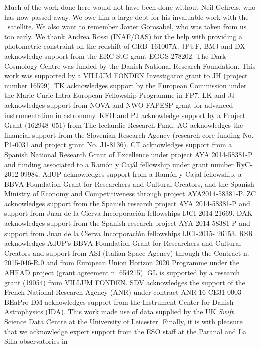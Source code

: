 \documentclass[longauth]{aa}    %
\begin{document}
\begin{acknowledgements}
Much of the work done here would not have been done without Neil Gehrels, who
has now passed away. We owe him a large debt for his invaluable work with the
\swift~satellite. We also want to remember Javier Gorosabel, who was taken from
us too early. 
%
We thank Andrea Rossi (INAF/OAS) for the help with providing a photometric
constraint on the redshift of GRB~161007A.
%
JPUF, BMJ and DX acknowledge support from the ERC-StG grant EGGS-278202.
The Dark Cosmology Centre was funded by the Danish National Research
Foundation. 
%
This work was supported by a VILLUM FONDEN Investigator grant to JH
(project number 16599). 
%
TK acknowledges support by the European Commission
under the Marie Curie Intra-European Fellowship Programme in FP7.  
%
LK and JJ acknowledges
support from NOVA and NWO-FAPESP grant for advanced instrumentation in
astronomy. 
%
KEH and PJ acknowledge support by a Project Grant (162948--051) from
The Icelandic Research Fund. 
%
AG acknowledges the financial support from the
Slovenian Research Agency (research core funding No. P1-0031 and project grant
No. J1-8136). 
%
CT acknowledges support from a Spanish National Research Grant of Excellence
under project AYA 2014-58381-P and funding associated to a Ramón y Cajál
fellowship under grant number RyC-2012-09984.
%
AdUP acknowledges support from a Ramón y Cajal fellowship, a BBVA Foundation
Grant for Researchers and Cultural Creators, and the Spanish Ministry of Economy
and Competitiveness through project AYA2014-58381-P.
%
ZC acknowledges support from the Spanish research project AYA 2014-58381-P and
support from Juan de la Cierva Incorporaci\'on fellowships IJCI-2014-21669.
%
DAK acknowledges support from the Spanish research project AYA 2014-58381-P and
support from Juan de la Cierva Incorporaci\'on fellowships IJCI-2015- 26153.
%
RSR acknowledges AdUP's BBVA Foundation Grant for Researchers and Cultural
Creators and support from ASI (Italian Space Agency) through the Contract n.
2015-046-R.0 and from European Union Horizon 2020 Programme under the AHEAD
project (grant agreement n. 654215).
%
GL is supported by a research grant (19054) from VILLUM FONDEN.
%
SDV acknowledges the support of the French National Research Agency (ANR) under
contract ANR-16-CE31-0003 BEaPro
%
DM acknowledges support from the Instrument Center for Danish Astrophysics
(IDA).
%
This work made use of data supplied by the UK {\it Swift} Science Data Centre at
the University of Leicester. Finally, it is with pleasure that we acknowledge
expert support from the ESO staff at the Paranal and La Silla observatories in

\end{acknowledgements}
\end{document}
